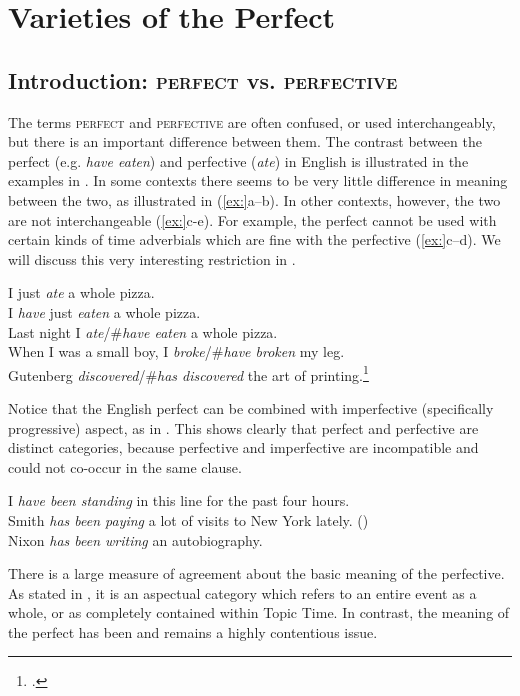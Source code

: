 \chapter{Varieties of the Perfect}\label{sec:22}

\section{Introduction: \textsc{perfect} vs. \textsc{perfective}}\label{sec:22.1}

The terms \textsc{perfect} and \textsc{perfective} are often confused, or used interchangeably, but there is an important difference between them. The contrast between the perfect (e.g. \textit{have eaten}) and perfective (\textit{ate}) in English is illustrated in the examples in . In some contexts there seems to be very little difference in meaning between the two, as illustrated in (\ref{ex:}a--b). In other contexts, however, the two are not interchangeable (\ref{ex:}c-e). For example, the perfect cannot be used with certain kinds of time adverbials which are fine with the perfective (\ref{ex:}c--d). We will discuss this very interesting restriction in .


\ea
\ea I just \textit{ate} a whole pizza.\\
\ex I \textit{have} just \textit{eaten} a whole pizza.\\
\ex Last night I \textit{ate}/\#\textit{have eaten} a whole pizza.\\
\ex When I was a small boy, I \textit{broke}/\#\textit{have broken} my leg.\\
\ex Gutenberg \textit{discovered}/\#\textit{has discovered} the art of printing.\footnote{\citet{McCoard1978}.}
                       \z
\z


Notice that the English perfect can be combined with imperfective (specifically progressive) aspect, as in . This shows clearly that perfect and perfective are distinct categories, because perfective and imperfective are incompatible and could not co-occur in the same clause.


\ea
\ea I \textit{have been standing} in this line for the past four hours.\\
\ex Smith \textit{has been paying} a lot of visits to New York lately.  (\citealt{Grice1975})\\
\ex Nixon \textit{has been writing} an autobiography.
                       \z
\z


There is a large measure of agreement about the basic meaning of the perfective. As stated in , it is an aspectual category which refers to an entire event as a whole, or as completely contained within Topic Time. In contrast, the meaning of the perfect has been and remains a highly contentious issue.




